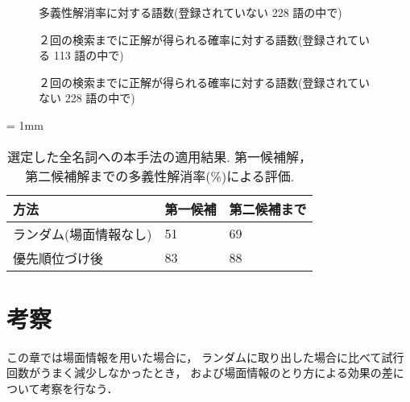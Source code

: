 \begin{figure}
  \begin{center}
  \end{center}
  \caption{多義性解消率に対する語数(登録されていない 228 語の中で)}
  \label{disam1_nonregistered}
\end{figure}

\begin{figure}
  \begin{center}
  \end{center}
  \caption{２回の検索までに正解が得られる確率に対する語数(登録されている 113 語の中で)}
  \label{disam2_registered}
\end{figure}

\begin{figure}
  \begin{center}
  \end{center}
  \caption{２回の検索までに正解が得られる確率に対する語数(登録されていない 228 語の中で)}
  \label{disam2_nonregistered}
\end{figure}

\small
\begin{table}
  \caption{選定した全名詞への本手法の適用結果. 
           第一候補解，第二候補解までの多義性解消率(\%)による評価.}
  \label{result_disam_table}
  \begin{center}
    \tabcolsep = 1mm
    \begin{tabular}{|l|l|l|} \hline
方法                   & 第一候補 & 第二候補まで \\ \hline
ランダム(場面情報なし) & 51       & 69 \\
優先順位づけ後         & 83       & 88 \\ \hline
    \end{tabular}
  \end{center}
\end{table}
\normalsize

\section{考察}

この章では場面情報を用いた場合に，
ランダムに取り出した場合に比べて試行回数がうまく減少しなかったとき，
および場面情報のとり方による効果の差について考察を行なう．

